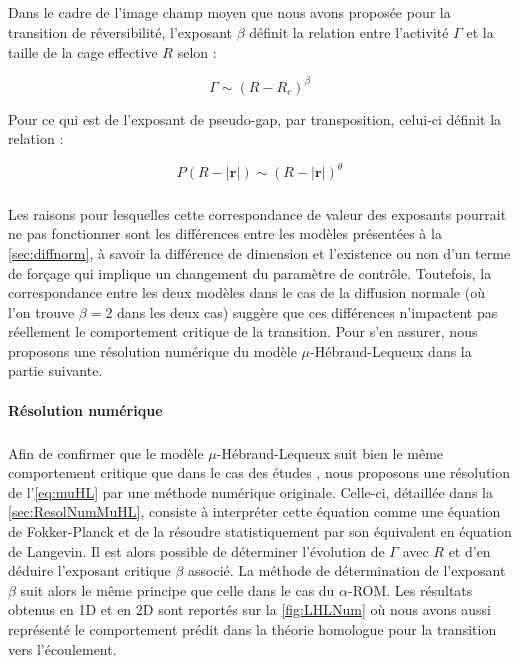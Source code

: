 \subparagraph{}Dans le cadre de l'image champ moyen que nous avons proposée pour la transition de réversibilité, l'exposant $\beta$ définit la relation entre l'activité $\Gamma$ et la taille de la cage effective $R$ selon :

\begin{equation}
	\Gamma \sim (R-R_c)^\beta
\end{equation}

\noindent Pour ce qui est de l'exposant de pseudo-gap, par transposition, celui-ci définit la relation :

\begin{equation}
	P(R-|\mathbf{r}|)\sim (R-|\mathbf{r}|)^\theta
\end{equation}

\subparagraph{}Les raisons pour lesquelles cette correspondance de valeur des exposants pourrait ne pas fonctionner sont les différences entre les modèles présentées à la \autoref{sec:diffnorm}, à savoir la différence de dimension et l'existence ou non d'un terme de forçage qui implique un changement du paramètre de contrôle. Toutefois, la correspondance entre les deux modèles dans le cas de la diffusion normale (où l'on trouve $\beta = 2$ dans les deux cas) suggère que ces différences n'impactent pas réellement le comportement critique de la transition. Pour s'en assurer, nous proposons une résolution numérique du modèle $\mu$-Hébraud-Lequeux dans la partie suivante.

\paragraph{Résolution numérique}

\subparagraph{}Afin de confirmer que le modèle $\mu$-Hébraud-Lequeux suit bien le même comportement critique que dans le cas des études \cite{lin_mean-field_2016, lin_microscopic_2018}, nous proposons une résolution de l'\autoref{eq:muHL} par une méthode numérique originale. Celle-ci, détaillée dans la \autoref{sec:ResolNumMuHL}, consiste à interpréter cette équation comme une équation de Fokker-Planck et de la résoudre statistiquement par son équivalent en équation de Langevin. Il est alors possible de déterminer l'évolution de $\Gamma$ avec $R$ et d'en déduire l'exposant critique $\beta$ associé. La méthode de détermination de l'exposant $\beta$ suit alors le même principe que celle dans le cas du $\alpha$-ROM. Les résultats obtenus en 1D et en 2D sont reportés sur la \autoref{fig:LHLNum} où nous avons aussi représenté le comportement prédit dans la théorie homologue pour la transition vers l'écoulement.

